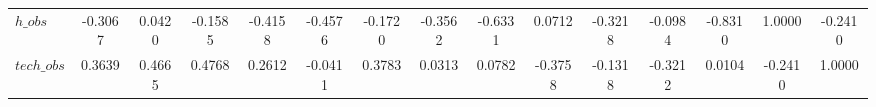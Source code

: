 \begin{center}
\begin{longtable}{lcccccccccccccc}
$h\_obs         $	 & 	          -0.3067	 & 	           0.0420	 & 	          -0.1585	 & 	          -0.4158	 & 	          -0.4576	 & 	          -0.1720	 & 	          -0.3562	 & 	          -0.6331	 & 	           0.0712	 & 	          -0.3218	 & 	          -0.0984	 & 	          -0.8310	 & 	           1.0000	 & 	          -0.2410 \\ 
$tech\_obs      $	 & 	           0.3639	 & 	           0.4665	 & 	           0.4768	 & 	           0.2612	 & 	          -0.0411	 & 	           0.3783	 & 	           0.0313	 & 	           0.0782	 & 	          -0.3758	 & 	          -0.1318	 & 	          -0.3212	 & 	           0.0104	 & 	          -0.2410	 & 	           1.0000 \\ 
\end{longtable}
 \end{center}
